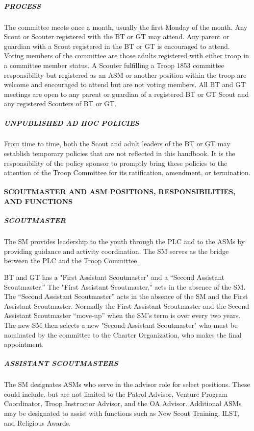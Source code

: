 \documentclass{ltxguide}
\begin{document}
\subparagraph{PROCESS}
The committee meets once a month, usually the first Monday of the month. Any Scout or Scouter registered with the \ac{BT} or \ac{GT} may attend. Any parent or guardian with a Scout registered in the \ac{BT} or \ac{GT} is encouraged to attend. Voting members of the committee are those adults registered with either troop in a committee member status. A Scouter fulfilling a Troop 1853 committee responsibility but registered as an \ac{ASM} or another position within the troop are welcome and encouraged to attend but are not voting members. All \ac{BT} and \ac{GT} meetings are open to any parent or guardian of a registered \ac{BT} or \ac{GT} Scout and any registered Scouters of \ac{BT} or \ac{GT}.

\subparagraph{UNPUBLISHED AD HOC POLICIES}
From time to time, both the Scout and adult leaders of the \ac{BT} or \ac{GT} may establish temporary policies that are not reflected in this handbook. It is the responsibility of the policy sponsor to promptly bring these policies to the attention of the Troop Committee for its  ratification, amendment, or termination.

\paragraph{SCOUTMASTER AND \ac{ASM} POSITIONS,  RESPONSIBILITIES, AND FUNCTIONS}
\subparagraph{SCOUTMASTER}
The \ac{SM} provides leadership to the youth through the \ac{PLC} and to the \acp{ASM} by providing guidance and activity coordination. The \ac{SM} serves as the bridge between the \ac{PLC} and the Troop Committee.

\ac{BT} and \ac{GT} has a "First Assistant Scoutmaster" and a “Second Assistant Scoutmaster.” The "First Assistant Scoutmaster," acts in the absence of the \ac{SM}. The “Second Assistant Scoutmaster” acts in the absence of the \ac{SM} and the First Assistant Scoutmaster. Normally the First Assistant Scoutmaster and the Second Assistant Scoutmaster “move-up” when the \ac{SM}'s term is over every two years. The new \ac{SM} then selects a new "Second Assistant Scoutmaster" who must be nominated by the committee to the Charter Organization, who makes the final appointment.

\subparagraph{ASSISTANT SCOUTMASTERS}
The \ac{SM} designates \acp{ASM} who serve in the advisor role for select positions. These could include, but are not limited to the Patrol Advisor, Venture Program Coordinator, Troop Instructor Advisor, and the \ac{OA} Advisor. Additional \acp{ASM} may be designated to assist with functions such as New Scout Training, \ac{ILST}, and Religious Awards.
\end{document}
